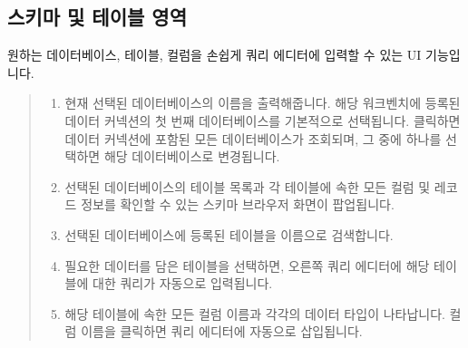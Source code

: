 \documentclass[letterpaper,10pt,english]{sphinxmanual}
\begin{document}
\subsection{스키마 및 테이블 영역}
\label{\detokenize{discovery/part06/06_03-use_a_workbench:workbench-use-2}}\label{\detokenize{discovery/part06/06_03-use_a_workbench:id3}}
원하는 데이터베이스, 테이블, 컬럼을 손쉽게 쿼리 에디터에 입력할 수 있는 UI 기능입니다.
\begin{quote}

\begin{figure}[H]
\centering

\noindent{}
\end{figure}
\begin{enumerate}
\def\theenumi{\arabic{enumi}}
\def\labelenumi{\theenumi .}
\makeatletter\def\p@enumii{\p@enumi \theenumi .}\makeatother
\item {} 
 현재 선택된 데이터베이스의 이름을 출력해줍니다. 해당 워크벤치에 등록된 데이터 커넥션의 첫 번째 데이터베이스를 기본적으로 선택됩니다. 클릭하면 데이터 커넥션에 포함된 모든 데이터베이스가 조회되며, 그 중에 하나를 선택하면 해당 데이터베이스로 변경됩니다.

\item {} 
 선택된 데이터베이스의 테이블 목록과 각 테이블에 속한 모든 컬럼 및 레코드 정보를 확인할 수 있는 스키마 브라우저 화면이 팝업됩니다.

\item {} 
 선택된 데이터베이스에 등록된 테이블을 이름으로 검색합니다.

\item {} 
 필요한 데이터를 담은 테이블을 선택하면, 오른쪽 쿼리 에디터에 해당 테이블에 대한  쿼리가 자동으로 입력됩니다.

\item {} 
 해당 테이블에 속한 모든 컬럼 이름과 각각의 데이터 타입이 나타납니다. 컬럼 이름을 클릭하면 쿼리 에디터에 자동으로 삽입됩니다.

\end{enumerate}
\end{quote}
\end{document}
